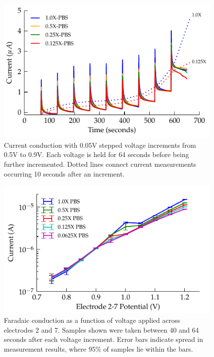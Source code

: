 \documentclass[journal, a4paper]{IEEEtran}
\begin{document}
\begin{figure}
    \begin{center}
        \includegraphics{graphics/currentTimeFaradaicCPE_Stacked_IEEE}
    \end{center}
    \caption{Current conduction with 0.05\thinspace V stepped voltage increments from 0.5\thinspace V to 0.9V. Each voltage is held for 64 seconds before being further incremented. Dotted lines connect current measurements occurring 10 seconds after an increment.}
    \label{fig:StepResponse_Faradaic}
\end{figure}


\begin{figure}
    \begin{center}
        \includegraphics{graphics/currentVoltage_logY_IEEE}
    \end{center}
    \caption{Faradaic conduction as a function of voltage applied across electrodes 2 and 7. Samples shown were taken between 40 and 64 seconds after each voltage increment. Error bars indicate spread in measurement results, where 95\% of samples lie within the bars.}
    \label{fig:faradaic_logCurrentVsVoltage}
\end{figure}
\end{document}
